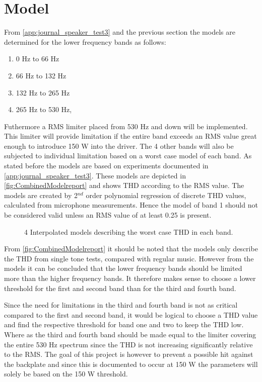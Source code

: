 \section{Model}
From \autoref{app:journal_speaker_test3} and the previous section the models are determined for the lower frequency bands as follows:
\begin{enumerate}
\item 0 Hz to 66 Hz
\item 66 Hz to 132 Hz
\item 132 Hz to 265 Hz
\item 265 Hz to 530 Hz,
\end{enumerate}
Futhermore a RMS limiter placed from 530 Hz and down will be implemented. This limiter will provide limitation if the entire band exceeds an RMS value great enough to introduce 150 W into the driver. The 4 other bands will also be subjected to individual limitation based on a worst case model of each band. As stated before the models are based on experiments documented in \autoref{app:journal_speaker_test3}. These models are depicted in \autoref{fig:CombinedModelreport} and shows THD according to the RMS value. The models are created by 2$^{nd}$ order polynomial regression of discrete THD values, calculated from microphone measurements. Hence the model of band 1 should not be considered valid unless an RMS value of at least 0.25 is present.

\begin{figure}[H]
    \centering
    
    \caption{4 Interpolated models describing the worst case THD in each band.}
    \label{fig:CombinedModelreport}
\end{figure}

From \autoref{fig:CombinedModelreport} it should be noted that the models only describe the THD from single tone tests, compared with regular music. However from the models it can be concluded that the lower frequency bands should be limited more than the higher frequency bands. It therefore makes sense to choose a lower threshold for the first and second band than for the third and fourth band. 

\vspace{2mm}
Since the need for limitations in the third and fourth band is not as critical compared to the first and second band, it would be logical to choose a THD value and find the respective threshold for band one and two to keep the THD low. Where as the third and fourth band should be made equal to the limiter covering the entire 530 Hz spectrum since the THD is not increasing significantly relative to the RMS. The goal of this project is however to prevent a possible hit against the backplate and since this is documented to occur at 150 W the parameters will solely be based on the 150 W threshold. 